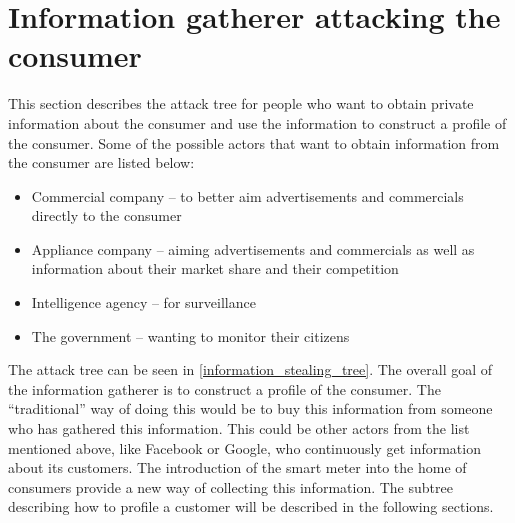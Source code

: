 \section{Information gatherer attacking the consumer}\label{informationGathererVsConsumer}
This section describes the attack tree for people who want to obtain private information about the consumer and use the information to construct a profile of the consumer.
Some of the possible actors that want to obtain information from the consumer are listed below:
\begin{itemize}
\item Commercial company -- to better aim advertisements and commercials directly to the consumer
\item Appliance company -- aiming advertisements and commercials as well as information about their market share and their competition
\item Intelligence agency -- for surveillance
\item The government -- wanting to monitor their citizens
\end{itemize}

The attack tree can be seen in \cref{information_stealing_tree}.
The overall goal of the information gatherer is to construct a profile of the consumer.
The ``traditional'' way of doing this would be to buy this information from someone who has gathered this information.
This could be other actors from the list mentioned above, like Facebook or Google, who continuously get information about its customers.
The introduction of the smart meter into the home of consumers provide a new way of collecting this information.
The subtree describing how to profile a customer will be described in the following sections.




